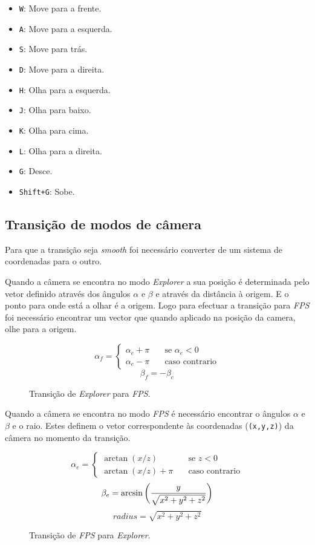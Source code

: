 \documentclass[a4paper]{article}
\begin{document}
\begin{itemize}
    \item \texttt{W}: Move para a frente.
    \item \texttt{A}: Move para a esquerda.
    \item \texttt{S}: Move para trás.
    \item \texttt{D}: Move para a direita.
    \item \texttt{H}: Olha para a esquerda.
    \item \texttt{J}: Olha para baixo.
    \item \texttt{K}: Olha para cima.
    \item \texttt{L}: Olha para a direita.
    \item \texttt{G}: Desce.
    \item \texttt{Shift+G}: Sobe.
\end{itemize}

\subsection{Transição de modos de câmera}

Para que a transição seja \textit{smooth} foi necessário converter de um sistema de coordenadas para o outro.

Quando a câmera se encontra no modo \textit{Explorer} a sua posição é determinada pelo vetor definido através dos ângulos $\alpha$ e $\beta$ e através da distância à origem. E o ponto para onde está a olhar é a origem. Logo para efectuar a transição para \textit{FPS} foi necessário encontrar um vector que quando aplicado na posição da camera, olhe para a origem.

\begin{figure}[H]
    \[
        \alpha_f =
        \begin{cases}
            \alpha_e + \pi & \quad \text{se } \alpha_e < 0\\
            \alpha_e - \pi & \quad \text{caso contrario}
        \end{cases}
    \]
    \[
        \beta_f = -\beta_e
    \]
    \caption{Transição de \textit{Explorer} para \textit{FPS}.}
\end{figure}

Quando a câmera se encontra no modo \textit{FPS} é necessário encontrar o ângulos $\alpha$ e $\beta$ e o raio. Estes definem o vetor correspondente às coordenadas (\texttt{(x,y,z)}) da câmera no momento da transição.

\begin{figure}[H]
    \[
        \alpha_e =
        \begin{cases}
            \arctan(x / z)       & \quad \text{se } z < 0\\
            \arctan(x / z) + \pi & \quad \text{caso contrario}
        \end{cases}
    \]
    \[
        \beta_e = \arcsin\bigg(\frac{y}{\sqrt{x^2 + y^2 + z^2}}\bigg)\\
    \]
    \[
        radius = \sqrt{x^2 + y^2 + z^2}
    \]
    \caption{Transição de \textit{FPS} para \textit{Explorer}.}
\end{figure}
\end{document}
